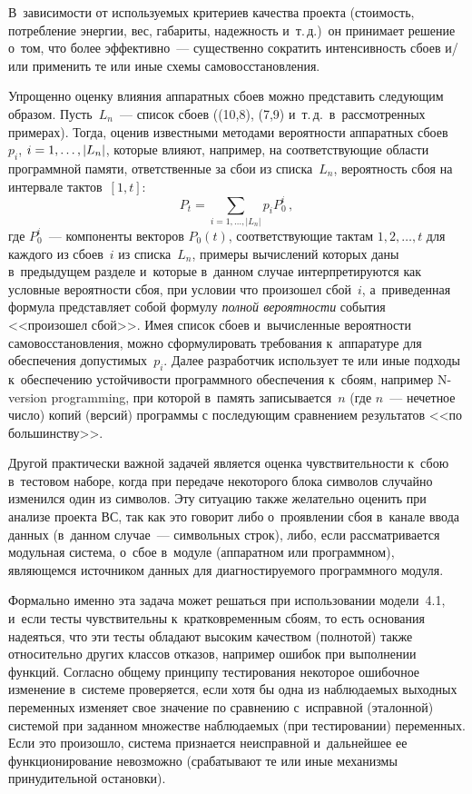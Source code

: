 \begin{multicols}{2}
В~зависимости от используемых критериев качества 
проекта (стоимость, потребление энергии, вес, габариты, надежность и~т.\,д.)\ 
он принимает решение о~том, что более эффективно~--- существенно 
сократить интенсивность сбоев и/или применить те или иные схемы 
самовосстановления. 

Упрощенно оценку влияния аппаратных сбоев можно 
представить следующим образом. Пусть~$L_{n}$~--- список сбоев ((10,8), (7,9) 
и~т.\,д.\ в~рассмотренных примерах). Тогда, оценив известными методами 
вероятности аппаратных сбоев~\cite{1-fr}~$p_i$, $i\hm=1, \ldots, \vert L_n\vert$, 
которые влияют, например, на соответствующие области программной памяти, 
ответственные за сбои из списка~$L_n$, вероятность сбоя на интервале 
тактов~$[1, t]$:    
     $$
     P_t=\sum\limits_{i=1,\ldots, \vert L_n\vert} p_i  P_0^i\,,
     $$
где $P_0^i$~--- компоненты векторов $P_0(t)$, соответствующие тактам $1, 
2,\ldots, t$ для каждого из сбоев~$i$ из списка~$L_n$, примеры вычислений 
которых даны в~предыдущем разделе и~которые в~данном случае 
интерпретируются как условные вероятности сбоя, при условии что произошел 
сбой~$i$, а~приведенная формула представляет собой формулу \textit{полной 
вероятности} события <<произошел сбой>>. Имея список сбоев 
и~вычисленные вероятности са\-мо\-вос\-ста\-нов\-ле\-ния, можно сформулировать 
требования к~аппаратуре для обеспечения допустимых~$p_i$. Далее 
разработчик использует те или иные подходы к~обеспечению устойчивости 
программного обеспечения к~сбоям, например N-version programming, при 
которой в~память записывается~$n$ (где $n$~--- нечетное число) копий 
(версий) программы с последующим сравнением результатов <<по 
большинству>>.
{

}

     Другой практически важной задачей является оценка чувствительности 
к~сбою в~тестовом наборе, когда при передаче некоторого блока символов 
случайно изменился один из символов. Эту ситуацию также желательно 
оценить при анализе проекта ВС, так как это говорит либо о~проявлении сбоя 
в~канале ввода данных (в~данном случае~--- символьных строк), либо, если 
рассматривается модульная система, о~сбое в~модуле (аппаратном или 
программном), являющемся источником данных для диагностируемого 
программного модуля.
     
     Формально именно эта задача может решаться при использовании 
модели~4.1, и~если тесты чувствительны к~кратковременным сбоям, то есть 
основания надеяться, что эти тесты обладают высоким качеством (полнотой) 
также относительно других классов отказов, например ошибок при 
выполнении функций. Согласно общему принципу тестирования некоторое 
ошибочное изменение в~сис\-те\-ме проверяется, если хотя бы одна из 
наблюдаемых выходных переменных изменяет свое значение по сравнению 
с~исправной (эталонной) сис\-те\-мой при заданном множестве наблюдаемых (при 
тестировании) переменных. Если это произошло, система признается 
неисправной и~дальнейшее ее функционирование невозможно (срабатывают те 
или иные механизмы принудительной остановки). 
{

}
\end{multicols}
